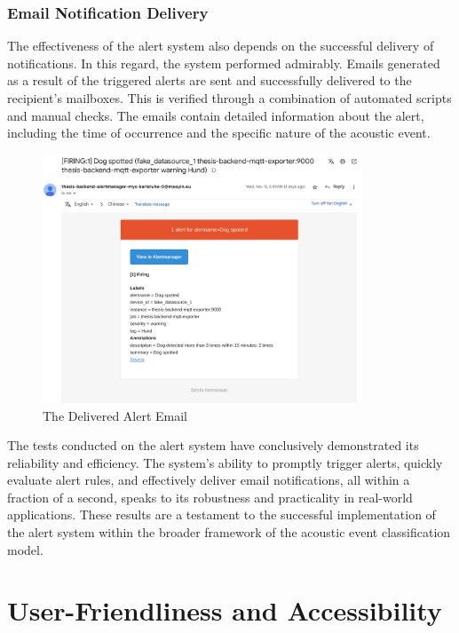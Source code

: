 
\subsubsection{Email Notification Delivery}
The effectiveness of the alert system also depends on the successful delivery of notifications. In this regard, the system performed admirably. Emails generated as a result of the triggered alerts are sent and successfully delivered to the recipient's mailboxes. This is verified through a combination of automated scripts and manual checks. The emails contain detailed information about the alert, including the time of occurrence and the specific nature of the acoustic event.

\begin{figure}[htbp]
  \centering
  \includegraphics[width=0.85\textwidth]{Pictures/email}
  \caption{\label{fig:email}The Delivered Alert Email}
\end{figure}

The tests conducted on the alert system have conclusively demonstrated its reliability and efficiency. The system's ability to promptly trigger alerts, quickly evaluate alert rules, and effectively deliver email notifications, all within a fraction of a second, speaks to its robustness and practicality in real-world applications. These results are a testament to the successful implementation of the alert system within the broader framework of the acoustic event classification model.

\section{User-Friendliness and Accessibility}
